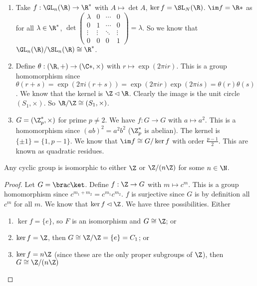 \documentclass[a4pape]{article}
\begin{document}
\begin{eg}\leavevmode
  \begin{enumerate}
  \item Take $f: \GL_n(\R) \to \R^*$ with $A \mapsto \det A$, $\ker f = \SL_N(\R)$. $\im f = \R*$ as for all $\lambda \in \R^*$, $\det 
    \begin{pmatrix}
      \lambda & 0 & \cdots & 0 \\
      0 &1 & \cdots & 0\\
      \vdots &\vdots &\ddots & \vdots\\
      0& 0 & 0 &1
    \end{pmatrix}
     = \lambda$. So we know that $\GL_n(\R)/\SL_n(\R) \cong \R^*$.
  \item Define $\theta: (\R, +) \to (\C*, \times)$ with $r\mapsto \exp(2\pi ir)$. This is a group homomorphism since $\theta(r + s) = \exp(2\pi i(r + s)) = \exp (2\pi i r)\exp (2\pi i s) = \theta(r)\theta(s)$. We know that the kernel is $\Z\lhd \R$. Clearly the image is the unit circle $(S_1, \times)$. So $\R/\Z \cong (S_1, \times)$.
  \item $G = (\Z_p^*, \times)$ for prime $p\not= 2$. We have $f: G\to G$ with $a\mapsto a^2$. This is a homomorphism since $(ab)^2 = a^2b^2$ ($\Z_p^*$ is abelian). The kernel is $\{\pm 1\} = \{1, p - 1\}$. We know that $\im f\cong G/\ker f$ with order $\frac{p - 1}{2}$. This are known as quadratic residues. 
  \end{enumerate}
\end{eg}

\begin{lemma}
  Any cyclic group is isomorphic to either $\Z$ or $\Z/(n\Z)$ for some $n\in \N$.
\end{lemma}

\begin{proof}
  Let $G = \bra c\ket$. Define $f: \Z \to G$ with $m\mapsto c^m$. This is a group homomorphism since $c^{m_1 + m_2} = c^{m_1}c^{m_2}$. $f$ is surjective since $G$ is by definition all $c^m$ for all $m$. We know that $\ker f\lhd \Z$. We have three possibilities. Either
  \begin{enumerate}
  \item $\ker f = \{e\}$, so $F$ is an isomorphism and $G\cong \Z$; or
  \item $\ker f = \Z$, then $G\cong \Z/\Z = \{e\} = C_1$; or
  \item $\ker f = n\Z$ (since these are the only proper subgroups of $\Z$), then $G\cong \Z/(n\Z)$
  \end{enumerate}
\end{proof}
\end{document}
